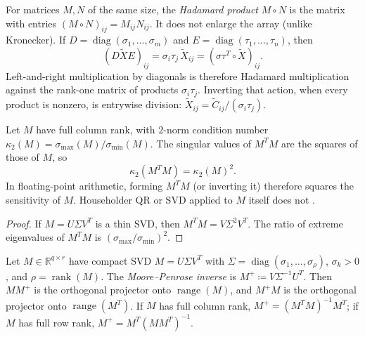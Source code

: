 \documentclass[11pt,a4paper]{article}
\DeclareMathOperator{\rank}{rank}
\begin{document}
\begin{definition}
\label{def:hadamard}
For matrices \(M,N\) of the same size, the \emph{Hadamard product} \(M\circ N\) is the matrix with entries \((M\circ N)_{ij}=M_{ij}N_{ij}\). It does not enlarge the array (unlike Kronecker). If \(D=\operatorname{diag}(\sigma_{1},\ldots,\sigma_{m})\) and \(E=\operatorname{diag}(\tau_{1},\ldots,\tau_{n})\), then
\[
(D\tilde{X}E)_{ij}
=
\sigma_{i}\tau_{j}\,\tilde{X}_{ij}
=
(\sigma\tau^{T}\circ\tilde{X})_{ij}.
\]
Left-and-right multiplication by diagonals is therefore Hadamard multiplication against the rank-one matrix of products \(\sigma_{i}\tau_{j}\). Inverting that action, when every product is nonzero, is entrywise division: \(\tilde{X}_{ij}=\tilde{C}_{ij}/(\sigma_{i}\tau_{j})\).
\end{definition}

\begin{lemma}
\label{lem:gram-cond}
Let \(M\) have full column rank, with \(2\)-norm condition number \(\kappa_{2}(M)=\sigma_{\max}(M)/\sigma_{\min}(M)\). The singular values of \(M^{T}M\) are the squares of those of \(M\), so
\[
\kappa_{2}(M^{T}M)
=
\kappa_{2}(M)^{2}.
\]
In floating-point arithmetic, forming \(M^{T}M\) (or inverting it) therefore squares the sensitivity of \(M\). Householder QR or SVD applied to \(M\) itself does not \cite{trefethen97,golub96}.
\end{lemma}

\begin{proof}
If \(M=U\Sigma V^{T}\) is a thin SVD, then \(M^{T}M=V\Sigma^{2}V^{T}\). The ratio of extreme eigenvalues of \(M^{T}M\) is \((\sigma_{\max}/\sigma_{\min})^{2}\).
\end{proof}

\begin{definition}
\label{def:pinv}
Let \(M\in\mathbb{R}^{q\times r}\) have compact SVD \(M=U\Sigma V^{T}\) with \(\Sigma=\operatorname{diag}(\sigma_{1},\ldots,\sigma_{\rho})\), \(\sigma_{k}>0\), and \(\rho=\rank(M)\). The \emph{Moore--Penrose inverse} is \(M^{+}\coloneqq V\Sigma^{-1}U^{T}\). Then \(MM^{+}\) is the orthogonal projector onto \(\operatorname{range}(M)\), and \(M^{+}M\) is the orthogonal projector onto \(\operatorname{range}(M^{T})\). If \(M\) has full column rank, \(M^{+}=(M^{T}M)^{-1}M^{T}\); if \(M\) has full row rank, \(M^{+}=M^{T}(MM^{T})^{-1}\).
\end{definition}
\end{document}
